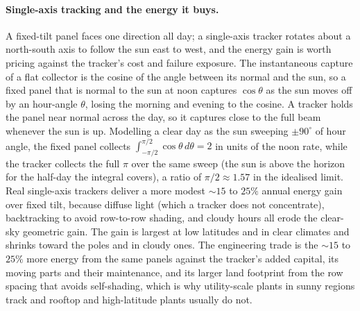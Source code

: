 \paragraph{Single-axis tracking and the energy it buys.} A fixed-tilt panel
faces one direction all day; a single-axis tracker rotates about a
north-south axis to follow the sun east to west, and the energy gain is worth
pricing against the tracker's cost and failure exposure. The instantaneous
capture of a flat collector is the cosine of the angle between its normal and
the sun, so a fixed panel that is normal to the sun at noon captures
$\cos\theta$ as the sun moves off by an hour-angle $\theta$, losing the
morning and evening to the cosine. A tracker holds the panel near normal
across the day, so it captures close to the full beam whenever the sun is up.
Modelling a clear day as the sun sweeping $\pm 90^\circ$ of hour angle, the
fixed panel collects $\int_{-\pi/2}^{\pi/2}\cos\theta\,d\theta = 2$ in units
of the noon rate, while the tracker collects the full $\pi$ over the same
sweep (the sun is above the horizon for the half-day the integral covers), a
ratio of $\pi/2 \approx 1.57$ in the idealised limit. Real single-axis
trackers deliver a more modest $\sim 15$ to $25\%$ annual energy gain over
fixed tilt, because diffuse light (which a tracker does not concentrate),
backtracking to avoid row-to-row shading, and cloudy hours all erode the
clear-sky geometric gain. The gain is largest at low latitudes and in clear
climates and shrinks toward the poles and in cloudy ones. The engineering
trade is the $\sim 15$ to $25\%$ more energy from the same panels against the
tracker's added capital, its moving parts and their maintenance, and its
larger land footprint from the row spacing that avoids self-shading, which is
why utility-scale plants in sunny regions track and rooftop and high-latitude
plants usually do not.

